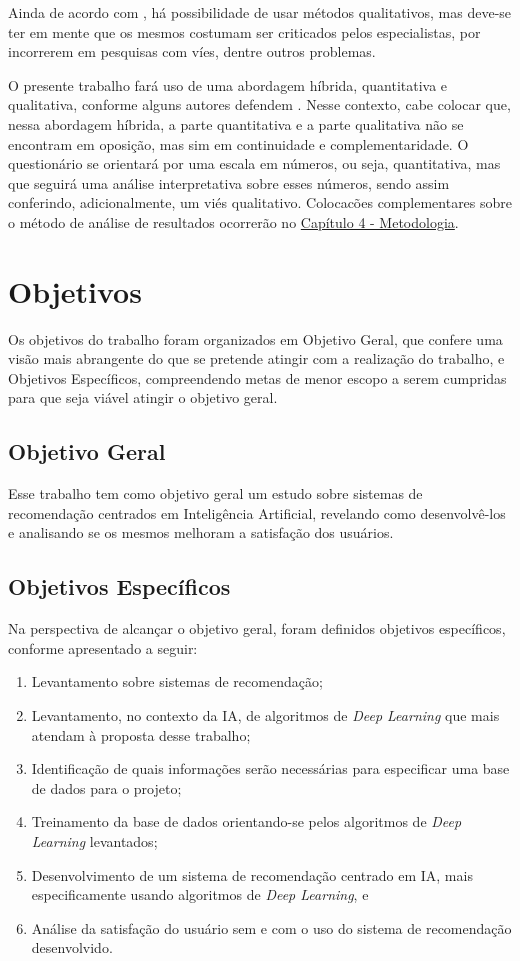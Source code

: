 Ainda de acordo com , há possibilidade de usar métodos qualitativos, mas deve-se ter em mente 
que os mesmos costumam ser criticados pelos especialistas, por incorrerem em pesquisas com víes, dentre outros problemas.

O presente trabalho fará uso de uma abordagem híbrida, quantitativa e qualitativa, conforme alguns autores defendem 
\cite{minayo1993}. Nesse contexto, cabe colocar que, nessa abordagem híbrida, a parte quantitativa e a parte qualitativa 
não se encontram em oposição, mas sim em continuidade e complementaridade. O questionário se orientará por uma escala em 
números, ou seja, quantitativa, mas que seguirá uma análise interpretativa sobre esses números, sendo assim conferindo, 
adicionalmente, um viés qualitativo. Colocacões complementares sobre o método de análise de resultados ocorrerão no 
\hyperref[chap:metodologia]{Capítulo 4 - Metodologia}.

\section{Objetivos}\label{sec:objetivos}
Os objetivos do trabalho foram organizados em Objetivo Geral, que confere uma visão mais abrangente do que se pretende 
atingir com a realização do trabalho, e Objetivos Específicos, compreendendo metas de menor escopo a serem cumpridas 
para que seja viável atingir o objetivo geral.

\subsection{Objetivo Geral}
Esse trabalho tem como objetivo geral um estudo sobre sistemas de recomendação centrados em Inteligência Artificial, 
revelando como desenvolvê-los e analisando se os mesmos melhoram a satisfação dos usuários.

\subsection{Objetivos Específicos}
Na perspectiva de alcançar o objetivo geral, foram definidos objetivos específicos, conforme apresentado a seguir:

\begin{enumerate}
    \item Levantamento sobre sistemas de recomendação;
    \item Levantamento, no contexto da IA, de algoritmos de \textit{Deep Learning} que mais atendam à proposta desse trabalho;
    \item Identificação de quais informações serão necessárias para especificar uma base de dados para o projeto;
    \item Treinamento da base de dados orientando-se pelos algoritmos de \textit{Deep Learning} levantados;
    \item Desenvolvimento de um sistema de recomendação centrado em IA, mais especificamente usando algoritmos de \textit{Deep Learning}, e
    \item Análise da satisfação do usuário sem e com o uso do sistema de recomendação desenvolvido.
\end{enumerate}

